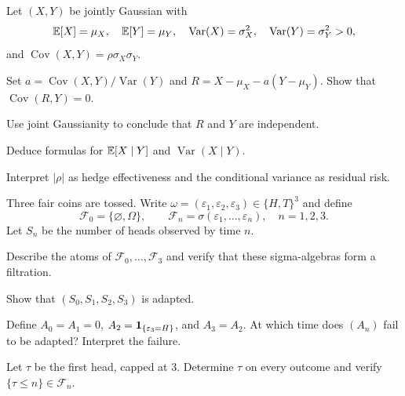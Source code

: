 \begin{exercise}
Let $(X,Y)$ be jointly Gaussian with
\[
\mathbb E[X]=\mu_X,\quad \mathbb E[Y]=\mu_Y,\quad
\operatorname{Var}(X)=\sigma_X^2,\quad
\operatorname{Var}(Y)=\sigma_Y^2>0,
\]
and $\operatorname{Cov}(X,Y)=\rho\sigma_X\sigma_Y$.
\begin{exparts}
  \item Set $a=\operatorname{Cov}(X,Y)/\operatorname{Var}(Y)$ and
  $R=X-\mu_X-a(Y-\mu_Y)$. Show that $\operatorname{Cov}(R,Y)=0$.
  \item Use joint Gaussianity to conclude that $R$ and $Y$ are independent.
  \item Deduce formulas for $\mathbb E[X\mid Y]$ and $\operatorname{Var}(X\mid Y)$.
  \item Interpret $|\rho|$ as hedge effectiveness and the conditional
  variance as residual risk.
\end{exparts}
\end{exercise}

\begin{exercise}
Three fair coins are tossed. Write
$\omega=(\varepsilon_1,\varepsilon_2,\varepsilon_3)\in\{H,T\}^3$ and define
\[
\mathcal F_0=\{\varnothing,\Omega\},\qquad
\mathcal F_n=\sigma(\varepsilon_1,\ldots,\varepsilon_n),\quad n=1,2,3.
\]
Let $S_n$ be the number of heads observed by time $n$.
\begin{exparts}
  \item Describe the atoms of $\mathcal F_0,\ldots,\mathcal F_3$ and verify
  that these sigma-algebras form a filtration.
  \item Show that $(S_0,S_1,S_2,S_3)$ is adapted.
  \item Define $A_0=A_1=0$, $A_2=\mathbf{1}_{\{\varepsilon_3=H\}}$, and $A_3=A_2$.
  At which time does $(A_n)$ fail to be adapted? Interpret the failure.
  \item Let $\tau$ be the first head, capped at $3$. Determine $\tau$ on every
  outcome and verify $\{\tau\leq n\}\in\mathcal F_n$.
\end{exparts}
\end{exercise}

